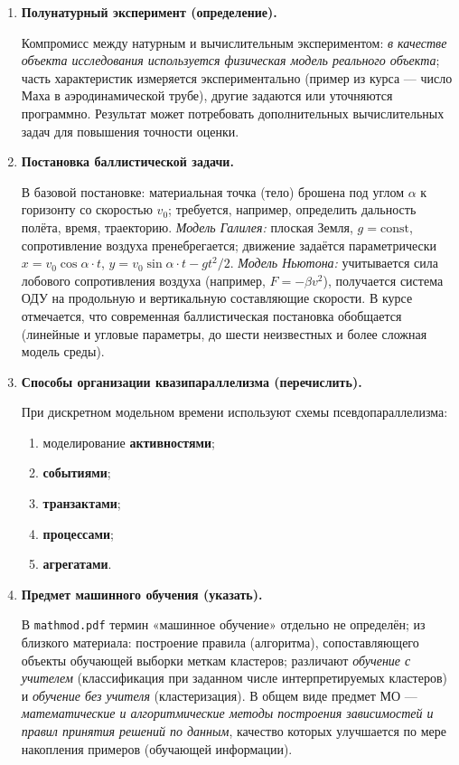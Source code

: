 \documentclass[12pt,a4paper]{article}
\begin{document}
\begin{enumerate}[label=\textbf{\arabic*.}]
\item \textbf{Полунатурный эксперимент (определение).}

Компромисс между натурным и вычислительным экспериментом: \emph{в качестве объекта исследования используется физическая модель реального объекта}; часть характеристик измеряется экспериментально (пример из курса — число Маха в аэродинамической трубе), другие задаются или уточняются программно. Результат может потребовать дополнительных вычислительных задач для повышения точности оценки.

\item \textbf{Постановка баллистической задачи.}

В базовой постановке: материальная точка (тело) брошена под углом $\alpha$ к горизонту со скоростью $v_0$; требуется, например, определить дальность полёта, время, траекторию. \emph{Модель Галилея:} плоская Земля, $g=\mathrm{const}$, сопротивление воздуха пренебрегается; движение задаётся параметрически $x=v_0\cos\alpha\cdot t$, $y=v_0\sin\alpha\cdot t-gt^2/2$. \emph{Модель Ньютона:} учитывается сила лобового сопротивления воздуха (например, $F=-\beta v^2$), получается система ОДУ на продольную и вертикальную составляющие скорости. В курсе отмечается, что современная баллистическая постановка обобщается (линейные и угловые параметры, до шести неизвестных и более сложная модель среды).

\item \textbf{Способы организации квазипараллелизма (перечислить).}

При дискретном модельном времени используют схемы псевдопараллелизма:
\begin{enumerate}[label=\arabic*)]
\item моделирование \textbf{активностями};
\item \textbf{событиями};
\item \textbf{транзактами};
\item \textbf{процессами};
\item \textbf{агрегатами}.
\end{enumerate}

\item \textbf{Предмет машинного обучения (указать).}

В \texttt{mathmod.pdf} термин «машинное обучение» отдельно не определён; из близкого материала: построение правила (алгоритма), сопоставляющего объекты обучающей выборки меткам кластеров; различают \emph{обучение с учителем} (классификация при заданном числе интерпретируемых кластеров) и \emph{обучение без учителя} (кластеризация). В общем виде предмет МО — \emph{математические и алгоритмические методы построения зависимостей и правил принятия решений по данным}, качество которых улучшается по мере накопления примеров (обучающей информации).


\end{enumerate}
\end{document}
